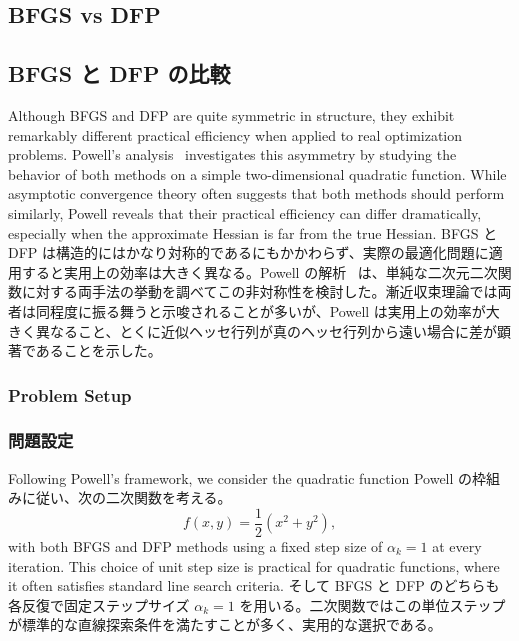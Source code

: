 \documentclass[0_main]{subfiles}
\begin{document}
\ifEn
    \subsection{BFGS vs DFP}
\else
    \subsection{BFGS と DFP の比較}
\fi

\ifEn
    Although BFGS and DFP are quite symmetric in structure, they exhibit remarkably different practical efficiency when applied to real optimization problems. Powell's analysis~\citep{powellHowBadAre1986} investigates this asymmetry by studying the behavior of both methods on a simple two-dimensional quadratic function. While asymptotic convergence theory often suggests that both methods should perform similarly, Powell reveals that their practical efficiency can differ dramatically, especially when the approximate Hessian is far from the true Hessian.
\else
    BFGS と DFP は構造的にはかなり対称的であるにもかかわらず、実際の最適化問題に適用すると実用上の効率は大きく異なる。Powell の解析~\citep{powellHowBadAre1986} は、単純な二次元二次関数に対する両手法の挙動を調べてこの非対称性を検討した。漸近収束理論では両者は同程度に振る舞うと示唆されることが多いが、Powell は実用上の効率が大きく異なること、とくに近似ヘッセ行列が真のヘッセ行列から遠い場合に差が顕著であることを示した。
\fi

\ifEn
    \subsubsection{Problem Setup}
\else
    \subsubsection{問題設定}
\fi

\ifEn
    Following Powell's framework, we consider the quadratic function
\else
    Powell の枠組みに従い、次の二次関数を考える。
\fi
\begin{equation*}
    f(x, y) = \frac{1}{2}(x^2 + y^2),
\end{equation*}
\ifEn
    with both BFGS and DFP methods using a fixed step size of $\alpha_k = 1$ at every iteration. This choice of unit step size is practical for quadratic functions, where it often satisfies standard line search criteria.
\else
    そして BFGS と DFP のどちらも各反復で固定ステップサイズ $\alpha_k = 1$ を用いる。二次関数ではこの単位ステップが標準的な直線探索条件を満たすことが多く、実用的な選択である。
\fi
\end{document}

